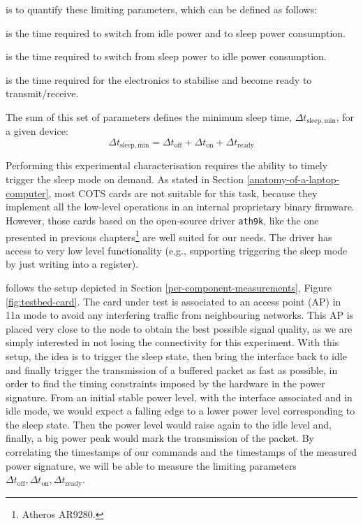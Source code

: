 \documentclass[twoside,nohyper]{tufte-book}
\providecommand{\tightlist}{%
  \setlength{\itemsep}{0pt}\setlength{\parskip}{0pt}}
\theoremstyle{definition}
\theoremstyle{definition}
\theoremstyle{definition}
\theoremstyle{remark}
\begin{document}
 is to quantify these limiting
parameters, which can be defined as follows:

\begin{description}
\tightlist
\item[\(\Delta t_\mathrm{off}\)]
is the time required to switch from idle power and to sleep power
consumption.
\item[\(\Delta t_\mathrm{on}\)]
is the time required to switch from sleep power to idle power
consumption.
\item[\(\Delta t_\mathrm{ready}\)]
is the time required for the electronics to stabilise and become ready
to transmit/receive.
\end{description}

The sum of this set of parameters defines the minimum sleep time,
\(\Delta t_\mathrm{sleep,min}\), for a given device:
%
\begin{equation}
 \Delta t_\mathrm{sleep,min} = \Delta t_\mathrm{off} + \Delta t_\mathrm{on} + \Delta t_\mathrm{ready}
 \label{eq:sleepmin}
\end{equation}
%


Performing this experimental characterisation requires the ability to
timely trigger the sleep mode on demand. As stated in Section
\ref{anatomy-of-a-laptop-computer}, most COTS cards are not suitable for
this task, because they implement all the low-level operations in an
internal proprietary binary firmware. However, those cards based on the
open-source driver \texttt{ath9k}, like the one presented in previous
chapters\footnote{Atheros AR9280.} are well suited for our needs. The
driver has access to very low level functionality (e.g., supporting
triggering the sleep mode by just writing into a register).

 follows the setup depicted in Section
\ref{per-component-measurements}, Figure \ref{fig:testbed-card}. The
card under test is associated to an access point (AP) in 11a mode to
avoid any interfering traffic from neighbouring networks. This AP is
placed very close to the node to obtain the best possible signal
quality, as we are simply interested in not losing the connectivity for
this experiment. With this setup, the idea is to trigger the sleep
state, then bring the interface back to idle and finally trigger the
transmission of a buffered packet as fast as possible, in order to find
the timing constraints imposed by the hardware in the power signature.
From an initial stable power level, with the interface associated and in
idle mode, we would expect a falling edge to a lower power level
corresponding to the sleep state. Then the power level would raise again
to the idle level and, finally, a big power peak would mark the
transmission of the packet. By correlating the timestamps of our
commands and the timestamps of the measured power signature, we will be
able to measure the limiting parameters
\(\Delta t_\mathrm{off}, \Delta t_\mathrm{on}, \Delta t_\mathrm{ready}\).
\end{document}
